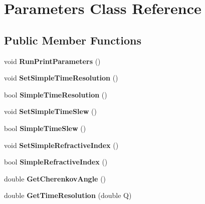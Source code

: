 \hypertarget{classParameters}{\section{Parameters Class Reference}
\label{classParameters}
}
\subsection*{Public Member Functions}
\begin{DoxyCompactItemize}
\item 
\hypertarget{classParameters_ad51d449c4d2963bef72fde2308966d8b}{void {\bfseries Run\-Print\-Parameters} ()}\label{classParameters_ad51d449c4d2963bef72fde2308966d8b}

\item 
\hypertarget{classParameters_a08f0965d2fe93066d0c550f08716829d}{void {\bfseries Set\-Simple\-Time\-Resolution} ()}\label{classParameters_a08f0965d2fe93066d0c550f08716829d}

\item 
\hypertarget{classParameters_ac1d25752b880deb537aa4344b40dca5e}{bool {\bfseries Simple\-Time\-Resolution} ()}\label{classParameters_ac1d25752b880deb537aa4344b40dca5e}

\item 
\hypertarget{classParameters_ac11f733ad0fa1552e523972433cbe0d1}{void {\bfseries Set\-Simple\-Time\-Slew} ()}\label{classParameters_ac11f733ad0fa1552e523972433cbe0d1}

\item 
\hypertarget{classParameters_aff94a6d602c527a3690cd1e79970b00b}{bool {\bfseries Simple\-Time\-Slew} ()}\label{classParameters_aff94a6d602c527a3690cd1e79970b00b}

\item 
\hypertarget{classParameters_a7c15c7be2a780eb1110ee3767eea4555}{void {\bfseries Set\-Simple\-Refractive\-Index} ()}\label{classParameters_a7c15c7be2a780eb1110ee3767eea4555}

\item 
\hypertarget{classParameters_a66a9a682eff6bf1f55aae967da3f7beb}{bool {\bfseries Simple\-Refractive\-Index} ()}\label{classParameters_a66a9a682eff6bf1f55aae967da3f7beb}

\item 
\hypertarget{classParameters_a593ddf265554ac4fb05f86d9ac82bc7a}{double {\bfseries Get\-Cherenkov\-Angle} ()}\label{classParameters_a593ddf265554ac4fb05f86d9ac82bc7a}

\item 
\hypertarget{classParameters_a754e96439c2c90e10337737055fbae8a}{double {\bfseries Get\-Time\-Resolution} (double Q)}\label{classParameters_a754e96439c2c90e10337737055fbae8a}


\end{DoxyCompactItemize}
